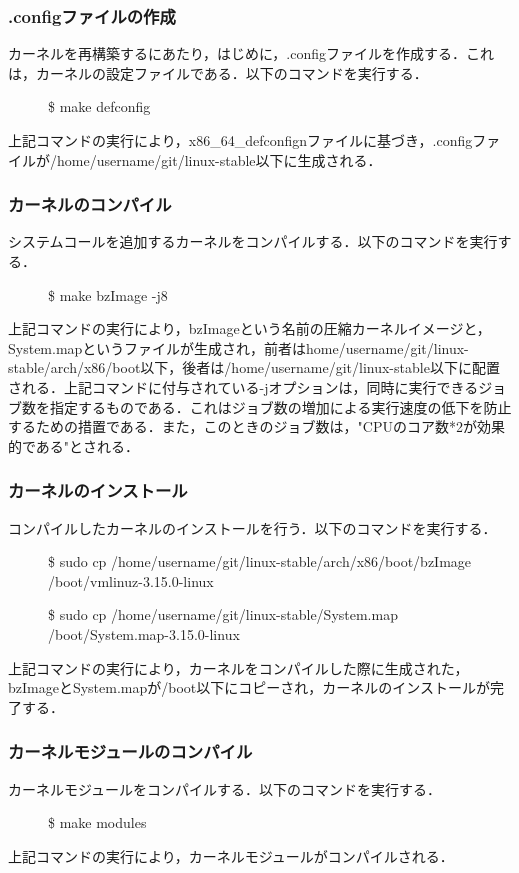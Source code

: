 \documentclass[12pt]{jsarticle}
\begin{document}
\subsubsection{.configファイルの作成}
カーネルを再構築するにあたり，はじめに，.configファイルを作成する．これは，カーネルの設定ファイルである．以下のコマンドを実行する．
\begin{description}
\item[] \$ make defconfig
\end{description}
上記コマンドの実行により，x86\_64\_defconfignファイルに基づき，.configファイルが/home/username/git/linux-stable以下に生成される．
\subsubsection{カーネルのコンパイル}
システムコールを追加するカーネルをコンパイルする．以下のコマンドを実行する．
\begin{description}
\item[] \$ make bzImage -j8
\end{description}
上記コマンドの実行により，bzImageという名前の圧縮カーネルイメージと，System.mapというファイルが生成され，前者はhome/username/git/linux-stable/arch/x86/boot以下，後者は/home/username/git/linux-stable以下に配置される．上記コマンドに付与されている-jオプションは，同時に実行できるジョブ数を指定するものである．これはジョブ数の増加による実行速度の低下を防止するための措置である．また，このときのジョブ数は，"CPUのコア数*2が効果的である"\cite{bootcamp}とされる．
\subsubsection{カーネルのインストール}
コンパイルしたカーネルのインストールを行う．以下のコマンドを実行する．
\begin{description}
\item[] \$ sudo cp /home/username/git/linux-stable/arch/x86/boot/bzImage /boot/vmlinuz-3.15.0-linux
\item[] \$ sudo cp /home/username/git/linux-stable/System.map /boot/System.map-3.15.0-linux
\end{description}
上記コマンドの実行により，カーネルをコンパイルした際に生成された，bzImageとSystem.mapが/boot以下にコピーされ，カーネルのインストールが完了する．
\subsubsection{カーネルモジュールのコンパイル}
カーネルモジュールをコンパイルする．以下のコマンドを実行する．
\begin{description}
\item[] \$ make modules
\end{description}
上記コマンドの実行により，カーネルモジュールがコンパイルされる．
\end{document}
